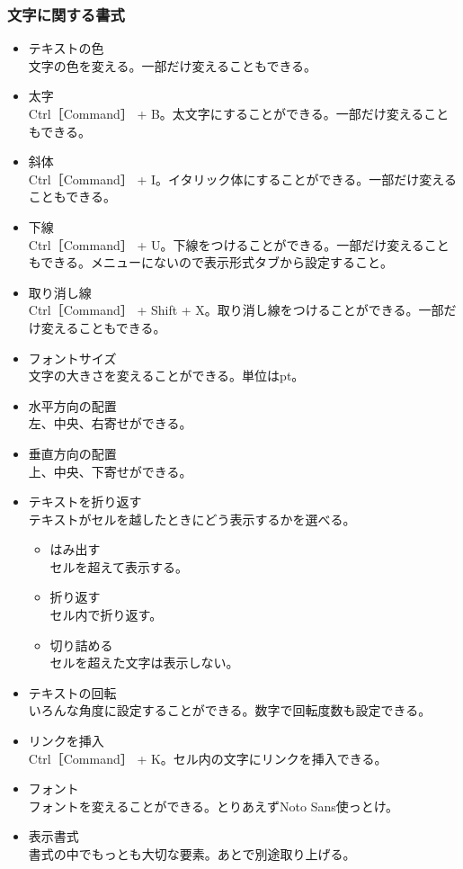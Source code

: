 \documentclass[dvipdfmx,jb5]{jreport}
\begin{document}
\subsubsection{文字に関する書式}
\begin{itemize}
      \item テキストの色\\
            文字の色を変える。一部だけ変えることもできる。
      \item 太字\\
            Ctrl［Command］ + B。太文字にすることができる。一部だけ変えることもできる。
      \item 斜体\\
            Ctrl［Command］ + I。イタリック体にすることができる。一部だけ変えることもできる。
      \item 下線\\
            Ctrl［Command］ + U。下線をつけることができる。一部だけ変えることもできる。メニューにないので表示形式タブから設定すること。
      \item 取り消し線\\
            Ctrl［Command］ + Shift + X。取り消し線をつけることができる。一部だけ変えることもできる。
      \item フォントサイズ\\
            文字の大きさを変えることができる。単位はpt。
      \item 水平方向の配置\\
            左、中央、右寄せができる。
      \item 垂直方向の配置\\
            上、中央、下寄せができる。
      \item テキストを折り返す\\
            テキストがセルを越したときにどう表示するかを選べる。
            \begin{itemize}
                  \item はみ出す\\
                        セルを超えて表示する。
                  \item 折り返す\\
                        セル内で折り返す。
                  \item 切り詰める\\
                        セルを超えた文字は表示しない。
            \end{itemize}
      \item テキストの回転\\
            いろんな角度に設定することができる。数字で回転度数も設定できる。
      \item リンクを挿入\\
            Ctrl［Command］ + K。セル内の文字にリンクを挿入できる。
      \item フォント\\
            フォントを変えることができる。とりあえずNoto Sans使っとけ。
      \item 表示書式\\
            書式の中でもっとも大切な要素。あとで別途取り上げる。
\end{itemize}
\end{document}
